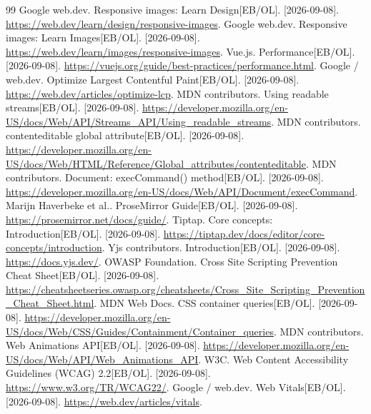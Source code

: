 \begin{thebibliography}{99}
Google web.dev. Responsive images: Learn Design[EB/OL]. [2026-09-08].
\url{https://web.dev/learn/design/responsive-images}.
Google web.dev. Responsive images: Learn Images[EB/OL]. [2026-09-08].
\url{https://web.dev/learn/images/responsive-images}.
Vue.js. Performance[EB/OL]. [2026-09-08].
\url{https://vuejs.org/guide/best-practices/performance.html}.
Google / web.dev. Optimize Largest Contentful Paint[EB/OL]. [2026-09-08].
\url{https://web.dev/articles/optimize-lcp}.
MDN contributors. Using readable streams[EB/OL]. [2026-09-08].
\url{https://developer.mozilla.org/en-US/docs/Web/API/Streams_API/Using_readable_streams}.
MDN contributors. contenteditable global attribute[EB/OL]. [2026-09-08].
\url{https://developer.mozilla.org/en-US/docs/Web/HTML/Reference/Global_attributes/contenteditable}.
MDN contributors. Document: execCommand() method[EB/OL]. [2026-09-08].
\url{https://developer.mozilla.org/en-US/docs/Web/API/Document/execCommand}.
Marijn Haverbeke et al.. ProseMirror Guide[EB/OL]. [2026-09-08].
\url{https://prosemirror.net/docs/guide/}.
Tiptap. Core concepts: Introduction[EB/OL]. [2026-09-08].
\url{https://tiptap.dev/docs/editor/core-concepts/introduction}.
Yjs contributors. Introduction[EB/OL]. [2026-09-08].
\url{https://docs.yjs.dev/}.
OWASP Foundation. Cross Site Scripting Prevention Cheat Sheet[EB/OL]. [2026-09-08].
\url{https://cheatsheetseries.owasp.org/cheatsheets/Cross_Site_Scripting_Prevention_Cheat_Sheet.html}.
MDN Web Docs. CSS container queries[EB/OL]. [2026-09-08].
\url{https://developer.mozilla.org/en-US/docs/Web/CSS/Guides/Containment/Container_queries}.
MDN contributors. Web Animations API[EB/OL]. [2026-09-08].
\url{https://developer.mozilla.org/en-US/docs/Web/API/Web_Animations_API}.
W3C. Web Content Accessibility Guidelines (WCAG) 2.2[EB/OL]. [2026-09-08].
\url{https://www.w3.org/TR/WCAG22/}.
Google / web.dev. Web Vitals[EB/OL]. [2026-09-08].
\url{https://web.dev/articles/vitals}.
\end{thebibliography}
